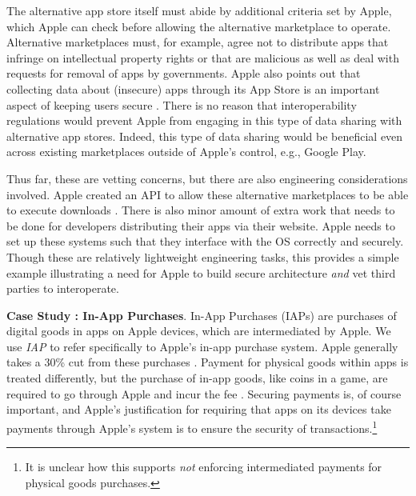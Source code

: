 \documentclass[letterpaper,twocolumn,10pt]{article}
\newcommand{\subh}[1]{\smallskip \noindent \textbf{{#1}}.}
\renewcommand{\paragraph}[1]{\subh{#1}}
\begin{document}
The alternative app store itself must abide by additional criteria set by Apple, which Apple can check before allowing the alternative marketplace to operate. Alternative marketplaces must, for example, agree not to distribute apps that infringe on intellectual property rights or that are malicious as well as deal with requests for removal of apps by governments\cite{apple_alt_market}.  
Apple also points out that collecting data about (insecure) apps through its App Store is an important aspect of keeping users secure \cite{apple_white_paper}. There is no reason that interoperability regulations would prevent Apple from engaging in this type of data sharing with alternative app stores. Indeed, this type of data sharing would be beneficial even across existing marketplaces outside of Apple's control, e.g., Google Play. 

Thus far, these are vetting concerns, but there are also engineering considerations involved.
Apple created an API to allow these alternative marketplaces to be able to execute downloads \cite{apple_alt_market}.  There is also minor amount of extra work that needs to be done for developers distributing their apps via their website\cite{apple_app_distribution_website}.  Apple needs to set up these systems such that they interface with the OS correctly and securely. Though these are relatively lightweight engineering tasks, this provides a simple example illustrating a need for Apple to build secure architecture \emph{and} vet third parties to interoperate.

\paragraph{Case Study \thecasestudy: In-App Purchases}
\label{sec:case-studies:iap}
In-App Purchases (IAPs) are purchases of digital goods in apps on Apple devices, which are intermediated by Apple.  We use \emph{IAP} to refer specifically to Apple's in-app purchase system.  Apple generally takes a 30\% cut from these purchases \cite{apple_membership}.  Payment for physical goods within apps is treated differently, but the purchase of in-app goods, like coins in a game, are required to go through Apple and incur the fee \cite{apple_app_review}.
Securing payments is, of course important, and Apple's justification for requiring that apps on its devices take payments through Apple's system is to ensure the security of transactions\cite{apple_white_paper}.\footnote{It is unclear how this supports \emph{not} enforcing intermediated payments for physical goods purchases.}
\end{document}
